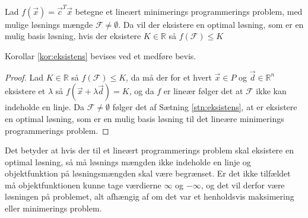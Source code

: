 \begin{kor}
Lad $f(\vec{x}) = \vec{c}^T\vec{x}$ betegne et lineært minimerings programmerings problem, med mulige løsnings mængde $\mathcal{F} \neq \emptyset$. 
Da vil der eksistere en optimal løsning, som er en mulig basis løsning, hvis der eksistere $K \in \mathds{R}$ så $f(\mathcal{F}) \leq K$ 
\label{kor:eksistens}
\end{kor}
Korollar \ref{kor:eksistens} bevises ved et medføre bevis.
\begin{proof}
Lad  $K \in \mathds{R}$ så $f(\mathcal{F}) \leq K$, da må der for et hvert $\vec{x} \in P$ og $\vec{d} \in \mathds{R}^n$ eksistere et $\lambda$ så $f(\vec{x}+\lambda \vec{d}) = K$, og da $f$ er lineær følger det at $\mathcal{F}$ ikke kan indeholde en linje. 
Da $\mathcal{F} \neq \emptyset$ følger det af Sætning \ref{stn:eksistens}, at er eksistere en optimal løsning, som er en mulig basis løsning til det lineære minimerings programmerings problem.
\end{proof}
Det betyder at hvis der til et lineært programmerings problem skal eksistere en optimal løsning, så må løsnings mængden ikke indeholde en linje og objektfunktion på løsningsmængden skal være begrænset. 
Er det ikke tilfældet må objektfunktionen kunne tage værdierne $\infty$ og $-\infty$, og det vil derfor være løsningen på problemet, alt afhængig af om det var et henholdsvis maksimering eller minimerings problem.

